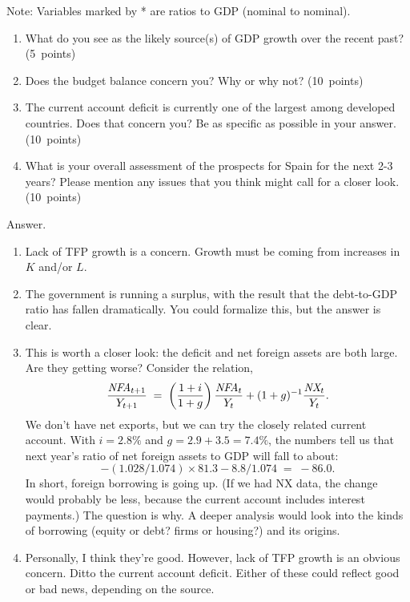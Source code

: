 \documentclass[letterpaper,12pt]{article}
\begin{document}
\begin{enumerate}
Note: Variables marked by * are ratios to GDP (nominal to nominal).  

\begin{enumerate}

\item What do you see as the likely source(s) of GDP growth 
over the recent past?  
(5~points)

\item Does the budget balance concern you?  
Why or why not?  (10~points)

\item The current account deficit is currently one of the largest 
among developed countries.
Does that concern you?  Be as specific as possible in your answer. 
(10~points)

\item What is your overall assessment of the prospects for Spain
for the next 2-3 years?  
Please mention any issues that you think might call for a closer look.  
(10~points)

\end{enumerate}

Answer.
\begin{enumerate}
\item Lack of TFP growth is a concern.  
Growth must be coming from increases in $K$ and/or $L$.  
\item The government is running a surplus, with the result that 
the debt-to-GDP ratio has fallen dramatically.  
You could formalize this, but the answer is clear.  
\item This is worth a closer look:  the deficit and net foreign assets
are both large.  
Are they getting worse?  
Consider the relation, 
\[
    \frac{\mbox{\em NFA}_{t+1}}{Y_{t+1}} \;=\; \left( \frac{1+i}{1+g} \right)
     \frac{\mbox{\em NFA}_{t}}{Y_{t}} + (1+g)^{-1} \frac{\mbox{\em NX}_{t}}{Y_{t}} .
\]
We don't have net exports, but we can try the closely related current account.
With $ i = 2.8\%$ and $ g = 2.9 + 3.5 = 7.4\%$, 
the numbers tell us that next year's ratio of net foreign 
assets to GDP will fall to about:
\[
    - (1.028/1.074) \times 81.3 - 8.8/1.074 \;=\; -86.0 .
\]
In short, foreign borrowing is going up. 
(If we had NX data, the change would probably be less, because 
the current account includes interest payments.) 
The question is why. 
A deeper analysis would look into the kinds of borrowing 
(equity or debt?  firms or housing?) and its origins.  

\item Personally, I think they're good.  
However, lack of TFP growth is an obvious concern.  
Ditto the current account deficit.
Either of these could reflect good or bad news, 
depending on the source. 


\end{enumerate}
\end{enumerate}
\end{document}

